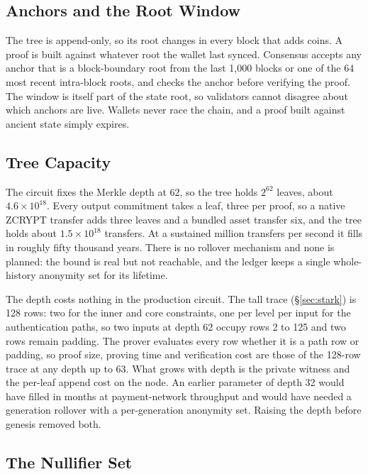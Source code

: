 \documentclass[twocolumn,10pt]{article}
\begin{document}
\subsection{Anchors and the Root Window}

The tree is append-only, so its root changes in every block that adds coins. A proof is built against whatever root the wallet last synced. Consensus accepts any anchor that is a block-boundary root from the last 1,000 blocks or one of the 64 most recent intra-block roots, and checks the anchor before verifying the proof. The window is itself part of the state root, so validators cannot disagree about which anchors are live. Wallets never race the chain, and a proof built against ancient state simply expires.

\subsection{Tree Capacity}
\label{sec:capacity}

The circuit fixes the Merkle depth at 62, so the tree holds $2^{62}$ leaves, about $4.6 \times 10^{18}$. Every output commitment takes a leaf, three per proof, so a native ZCRYPT transfer adds three leaves and a bundled asset transfer six, and the tree holds about $1.5 \times 10^{18}$ transfers. At a sustained million transfers per second it fills in roughly fifty thousand years. There is no rollover mechanism and none is planned: the bound is real but not reachable, and the ledger keeps a single whole-history anonymity set for its lifetime.

The depth costs nothing in the production circuit. The tall trace (\S\ref{sec:stark}) is 128 rows: two for the inner and core constraints, one per level per input for the authentication paths, so two inputs at depth 62 occupy rows 2 to 125 and two rows remain padding. The prover evaluates every row whether it is a path row or padding, so proof size, proving time and verification cost are those of the 128-row trace at any depth up to 63. What grows with depth is the private witness and the per-leaf append cost on the node. An earlier parameter of depth 32 would have filled in months at payment-network throughput and would have needed a generation rollover with a per-generation anonymity set. Raising the depth before genesis removed both.

\subsection{The Nullifier Set}
\end{document}

